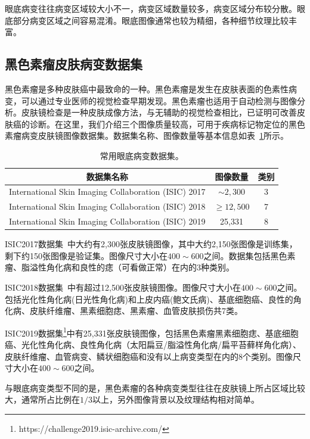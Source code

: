 眼底病变往往病变区域较大小不一，病变区域数量较多，病变区域分布较分散。眼底部分病变区域之间容易混淆。眼底图像通常也较为精细，各种细节纹理比较丰富。


\subsection{黑色素瘤皮肤病变数据集}\label{subsec:original_dermatoscope_ds_intro}
黑色素瘤是多种皮肤癌中最致命的一种。黑色素瘤是发生在皮肤表面的色素性病变，可以通过专业医师的视觉检查早期发现。黑色素瘤也适用于自动检测与图像分析。皮肤镜检查是一种皮肤成像方法，与无辅助的视觉检查相比，已证明可改善皮肤癌的诊断。在这里，我们介绍三个图像质量较高，可用于疾病标记物定位的黑色素瘤病变皮肤镜图像数据集。数据集名称、图像数量等基本信息如表~\ref{tab:skin_datasets_info}所示。

\begin{table}[h]
	\centering
	\caption{常用眼底病变数据集。}		
	\label{tab:skin_datasets_info}
	\begin{tabular}{c|c|c}
		\toprule[2pt]
		数据集名称 & 图像数量 & 类别 \\
		\midrule[2pt]
		International Skin Imaging Collaboration (ISIC) 2017 &  $\sim 2,300$ & 3  \\ \hline
		International Skin Imaging Collaboration (ISIC) 2018 & $\geq 12,500$ & 7  \\ \hline
		International Skin Imaging Collaboration (ISIC) 2019 & 25,331 & 8    \\ 
		\bottomrule[2pt]
	\end{tabular}
\end{table}

ISIC2017数据集~\cite{codella2018skin}中大约有2,300张皮肤镜图像，其中大约2,150张图像是训练集，剩下约150张图像是验证集。图像尺寸大小在$400\sim 600$之间。数据集包括黑色素瘤、脂溢性角化病和良性的痣（可看做正常）在内的3种类别。

ISIC2018数据集~\cite{codella2019skin, tschandl2018ham10000}中有超过12,500张皮肤镜图像。图像尺寸大小在$400\sim 600$之间。包括光化性角化病(日光性角化病)和上皮内癌(鲍文氏病)、基底细胞癌、良性的角化病、皮肤纤维瘤、黑素细胞痣、黑素瘤、血管皮肤损伤共7类。

ISIC2019数据集\footnote{https://challenge2019.isic-archive.com/}中有25,331张皮肤镜图像，包括黑色素瘤黑素细胞痣、基底细胞癌、光化性角化病、良性角化病（太阳扁豆/脂溢性角化病/扁平苔藓样角化病）、皮肤纤维瘤、血管病变、鳞状细胞癌和没有以上病变类型在内的8个类别。图像尺寸大小在$400\sim 600$之间。

与眼底病变类型不同的是，黑色素瘤的各种病变类型往往在皮肤镜上所占区域比较大，通常所占比例在$1/3$以上，另外图像背景以及纹理结构相对简单。

